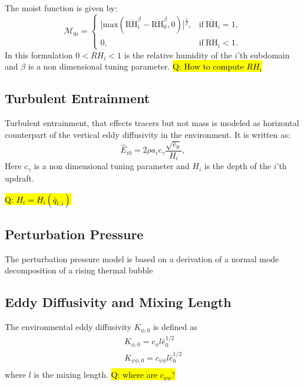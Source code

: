 \documentclass{report}
\begin{document}
The moist function is given by:
\begin{equation} \label{eq:detr_RH} 
\mathcal{M}_{0i} = \begin{cases}
      \Big[ \textrm{max}(\overline{\mathrm{RH}}_{i}^\beta - \overline{\mathrm{RH}}_0^\beta,0) \Big]^{\frac{1}{\beta}}, & \text{if}\ \overline{\mathrm{RH}}_{i} = 1, \\
      0, & \text{if}\ \overline{\mathrm{RH}}_{i} < 1.
    \end{cases}
\end{equation}
In this formulation $0<RH_i<1$ is the relative humidity of the $i$'th subdomain and $\beta$ is a non dimensional tuning parameter.  
\hl{Q: How to compute $RH_i$}

\subsection{Turbulent Entrainment} \label{sec:Turbulent Entrainment}
Turbulent entrainment, that effects tracers but not mass is modeled as horizontal counterpart of the vertical eddy diffusivity in the environment. It is written as:
\begin{equation} \label{eq:turb_entr} 
\hat{E}_{i0} = 2 \rho a_i c_{\gamma} \frac{\sqrt{\bar{e}_0}}{H_i},
\end{equation}
Here $c_{\gamma}$ is a non dimensional tuning parameter and $H_i$ is the depth of the $i$'th updraft. 

\hl{Q: $H_i = H_i(\bar{q}_{t,i})$}


\subsection{Perturbation Pressure} \label{sec:Perturbation Pressure}
The perturbation pressure model is based on a derivation of a normal mode decomposition of a rising thermal bubble \citep{}

\subsection{Eddy Diffusivity and Mixing Length} \label{sec:ED and ML}
The environmental eddy diffusivity $K_{\phi,0}$ is defined as
\begin{align}
K_{\phi,0} = c_{\phi} l \bar{e}_0^{1/2}\\
K_{\psi\phi,0} = c_{\psi\phi} l \bar{e}_0^{1/2}\\
\end{align}
where $l$ is the mixing length.
\hl{Q: where are  $c_{\psi\phi}$? }
\end{document}
